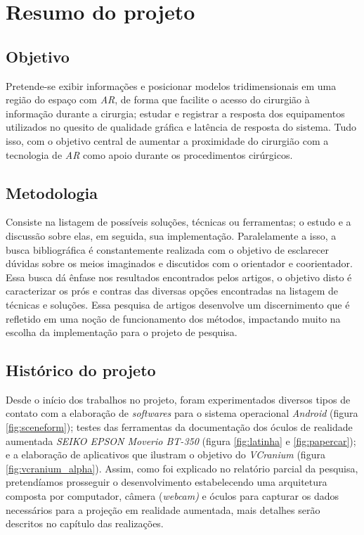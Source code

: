 \chapter{Resumo do projeto}\label{chp:resultadosEsparados}

\section{Objetivo}

Pretende-se exibir informações e posicionar modelos tridimensionais em uma região do espaço com \textit{AR}, de forma que facilite o acesso do cirurgião à informação durante a cirurgia; estudar e registrar a resposta dos equipamentos utilizados no quesito de qualidade gráfica e latência de resposta do sistema. Tudo isso, com o objetivo central de aumentar a proximidade do cirurgião com a tecnologia de \textit{AR} como apoio durante os procedimentos cirúrgicos.

\section{Metodologia}

Consiste na listagem de possíveis soluções, técnicas ou ferramentas; o estudo e a discussão sobre elas, em seguida, sua implementação. Paralelamente a isso, a busca bibliográfica é constantemente realizada com o objetivo de esclarecer dúvidas sobre os meios imaginados e discutidos com o orientador e coorientador. Essa busca dá ênfase nos resultados encontrados pelos artigos, o objetivo disto é caracterizar os prós e contras das diversas opções encontradas na listagem de técnicas e soluções. Essa pesquisa de artigos desenvolve um discernimento que é refletido em uma noção de funcionamento dos métodos, impactando muito na escolha da implementação para o projeto de pesquisa.

\section{Histórico do projeto}

Desde o início dos trabalhos no projeto, foram experimentados diversos tipos de contato com a elaboração de \textit{softwares} para o sistema operacional \textit{Android} (figura \ref{fig:sceneform}); testes das ferramentas da documentação dos óculos de realidade aumentada \textit{SEIKO EPSON Moverio BT-350} (figura \ref{fig:latinha} e \ref{fig:papercar}); e a elaboração de aplicativos que ilustram o objetivo do \textit{VCranium} (figura \ref{fig:vcranium_alpha}). Assim, como foi explicado no relatório parcial da pesquisa, pretendíamos prosseguir o desenvolvimento estabelecendo uma arquitetura composta por computador, câmera (\textit{webcam)} e óculos para capturar os dados necessários para a projeção em realidade aumentada, mais detalhes serão descritos no capítulo das realizações.

